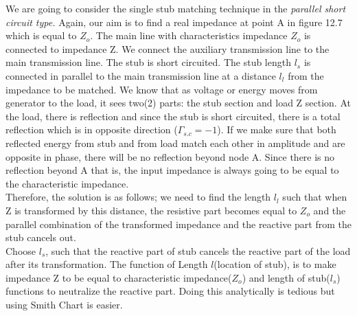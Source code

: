 We are going to consider the single stub matching technique in the\textit{ parallel short circuit type.} Again, our aim is to find a real impedance at point A in figure 12.7 which is equal to $Z_o$. The main line with characteristics impedance $ Z_o$ is connected to impedance Z. We connect the auxiliary transmission line to the main transmission line. The stub is short circuited. The stub length $l_s$ is connected in parallel to the main transmission line at a distance $ l_l$ from the impedance to be matched. We know that as voltage or energy moves from generator to the load, it sees two(2) parts: the stub section and load Z section. At the load, there is reflection and since the stub is short circuited, there is a total reflection which is in opposite direction ($\Gamma_{s.c} = -1$). If we make sure that both reflected energy from stub and from load match each other in amplitude and are opposite in phase, there will be no reflection beyond node A. Since there is no reflection beyond A that is, the input impedance is always going to be equal to the characteristic impedance.\\

Therefore, the solution is as follows; we need to find the length $ l_l$ such that when Z is transformed by this distance, the resistive part becomes equal to $Z_o$ and the parallel combination of the transformed impedance and the reactive part from the stub cancels out.\\

Choose $l_s$, such that the reactive part of stub cancels the reactive part of the load after its transformation. The function of Length $l$(location of stub), is to make impedance Z to be equal to characteristic impedance($Z_o$) and length of stub($l_s$) functions to neutralize the reactive part. Doing this analytically is tedious but using Smith Chart is easier.\\

